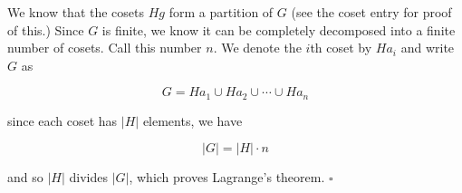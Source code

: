 \documentclass{article}
\begin{document}
We know that the cosets $Hg$ form a partition of $G$ (see the coset entry for proof of this.)  Since $G$ is finite, we know it can be completely decomposed into a finite number of cosets.  Call this number $n$.  We denote the $i$th coset by $Ha_i$ and write $G$ as 

$$ G = Ha_1 \cup Ha_2 \cup \cdots \cup Ha_n $$

since each coset has $|H|$ elements, we have 

$$ |G| = |H|\cdot n $$

and so $|H|$ divides $|G|$, which proves Lagrange's theorem. $\square$
\end{document}
